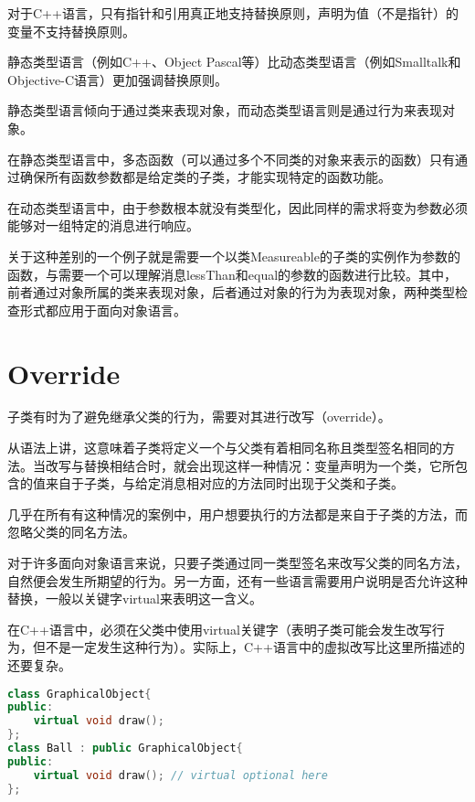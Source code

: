 对于C++语言，只有指针和引用真正地支持替换原则，声明为值（不是指针）的变量不支持替换原则。

静态类型语言（例如C++、Object Pascal等）比动态类型语言（例如Smalltalk和Objective-C语言）更加强调替换原则。

静态类型语言倾向于通过类来表现对象，而动态类型语言则是通过行为来表现对象。


\begin{compactitem}
\item 在静态类型语言中，多态函数（可以通过多个不同类的对象来表示的函数）只有通过确保所有函数参数都是给定类的子类，才能实现特定的函数功能。
\item 在动态类型语言中，由于参数根本就没有类型化，因此同样的需求将变为参数必须能够对一组特定的消息进行响应。
\end{compactitem}

关于这种差别的一个例子就是需要一个以类Measureable的子类的实例作为参数的函数，与需要一个可以理解消息lessThan和equal的参数的函数进行比较。其中，前者通过对象所属的类来表现对象，后者通过对象的行为为表现对象，两种类型检查形式都应用于面向对象语言。

\section{Override}

子类有时为了避免继承父类的行为，需要对其进行改写（override）。

从语法上讲，这意味着子类将定义一个与父类有着相同名称且类型签名相同的方法。当改写与替换相结合时，就会出现这样一种情况：变量声明为一个类，它所包含的值来自于子类，与给定消息相对应的方法同时出现于父类和子类。

几乎在所有有这种情况的案例中，用户想要执行的方法都是来自于子类的方法，而忽略父类的同名方法。

对于许多面向对象语言来说，只要子类通过同一类型签名来改写父类的同名方法，自然便会发生所期望的行为。另一方面，还有一些语言需要用户说明是否允许这种替换，一般以关键字virtual来表明这一含义。

在C++语言中，必须在父类中使用virtual关键字（表明子类可能会发生改写行为，但不是一定发生这种行为）。实际上，C++语言中的虚拟改写比这里所描述的还要复杂。

\begin{lstlisting}[language=C++]
class GraphicalObject{
public:
	virtual void draw();
};
class Ball : public GraphicalObject{
public:
	virtual void draw(); // virtual optional here	
};
\end{lstlisting}

